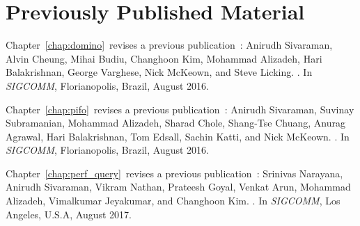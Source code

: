 \chapter*{Previously Published Material}
%

{
\setlength{\parindent}{0 pt}
\setlength{\parskip}{\baselineskip}

Chapter~\ref{chap:domino}~revises a previous
publication~\cite{domino}:
Anirudh Sivaraman, Alvin Cheung, Mihai Budiu, Changhoon Kim, Mohammad Alizadeh, Hari Balakrishnan, George Varghese, Nick McKeown, and Steve Licking.
.
\newblock In {\em SIGCOMM}, Florianopolis, Brazil, August 2016.

Chapter~\ref{chap:pifo}~revises a previous publication~\cite{pifo}: 
Anirudh Sivaraman, Suvinay Subramanian, Mohammad Alizadeh, Sharad Chole, Shang-Tse Chuang, Anurag Agrawal, Hari Balakrishnan, Tom Edsall, Sachin Katti, and Nick McKeown.
.
\newblock In {\em SIGCOMM}, Florianopolis, Brazil, August 2016.

Chapter~\ref{chap:perf_query}~revises a previous publication~\cite{perf_query}:
Srinivas Narayana, Anirudh Sivaraman, Vikram Nathan, Prateesh Goyal, Venkat Arun, Mohammad Alizadeh, Vimalkumar Jeyakumar, and Changhoon Kim.
.
\newblock In {\em SIGCOMM}, Los Angeles, U.S.A, August 2017.
}

